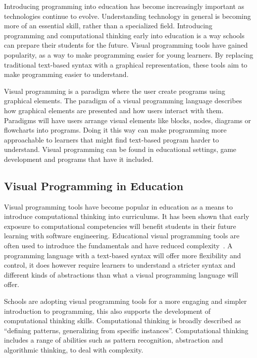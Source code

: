 Introducing programming into education has become increasingly important as technologies continue to evolve.
Understanding technology in general is becoming more of an essential skill, rather than a specialized field.
Introducing programming and computational thinking early into education is a way schools can prepare their students for the future.
Visual programming tools have gained popularity, as a way to make programming easier for young learners.
By replacing traditional text-based syntax with a graphical representation, these tools aim to make programming easier to understand.

Visual programming is a paradigm where the user create programs using graphical elements.
The paradigm of a visual programming language describes how graphical elements are presented and how users interact with them.
Paradigms will have users arrange visual elements like blocks, nodes, diagrams or flowcharts into programs.
Doing it this way can make programming more approachable to learners that might find text-based program harder to understand\cite{myers_taxonomies_1990}.
Visual programming can be found in educational settings, game development and programs that have it included.

\subsection{Visual Programming in Education}
Visual programming tools have become popular in education as a means to introduce computational thinking into curriculums.
It has been shown that early exposure to computational competencies will benefit students in their future learning with software engineering\cite{grover_computational_2013}.
Educational visual programming tools are often used to introduce the fundamentals and have reduced complexity~\cite{resnick_scratch_2009}.
A programming language with a text-based syntax will offer more flexibility and control, it does however require learners to understand a stricter syntax and different kinds of abstractions than what a visual programming language will offer.

Schools are adopting visual programming tools for a more engaging and simpler introduction to programming, this also supports the development of computational thinking skills.
Computational thinking is broadly described as “defining patterns, generalizing from specific instances”\cite{grover_computational_2013}.
Computational thinking includes a range of abilities such as pattern recognition, abstraction and algorithmic thinking, to deal with complexity.

